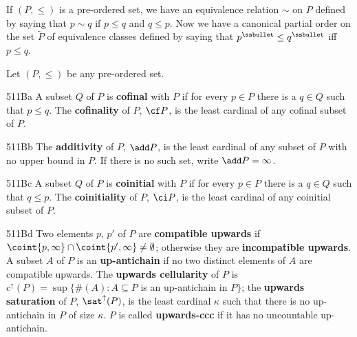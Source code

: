 If $(P,\le)$ is a pre-ordered set, we have an equivalence relation $\sim$
on $P$ defined by saying that $p\sim q$ if $p\le q$ and $q\le p$.   Now we
have a canonical partial order on the set $\tilde P$ of equivalence
classes defined by saying that $p^{\ssbullet}\le q^{\ssbullet}$ iff
$p\le q$.   

 Let $(P,\le)$ be any pre-ordered set.

\spheader 511Ba A subset $Q$ of $P$ is {\bf cofinal} with $P$ if for
every $p\in P$ there is a $q\in Q$ such that $p\le q$.   The
{\bf cofinality} of $P$, $\cf P$, is the least cardinal of any cofinal
subset of $P$.

\spheader 511Bb The {\bf additivity} of $P$, $\add P$, is the least
cardinal of any subset of $P$ with no upper bound in $P$.   If there is
no such set, write $\add P=\infty$.

\spheader 511Bc A subset $Q$ of $P$ is {\bf coinitial} with $P$ if for
every $p\in P$ there is a $q\in Q$ such that $q\le p$.   The
{\bf coinitiality} of $P$, $\ci P$, is the least cardinal of any
coinitial subset of $P$.

\spheader 511Bd Two elements $p$, $p'$ of $P$ are
{\bf compatible upwards} if
$\coint{p,\infty}\cap\coint{p',\infty}\ne\emptyset$;  otherwise they are
{\bf incompatible upwards}.   A subset $A$ of $P$ is an
{\bf up-antichain} if no two
distinct elements of $A$ are compatible upwards.   The {\bf
upwards cellularity} of $P$ is
$c^{\uparrow}(P)=\sup\{\#(A):A\subseteq P$ is an up-antichain in $P\}$;
the {\bf upwards saturation} of $P$, $\sat^{\uparrow}(P)$, is the least
cardinal $\kappa$ such that there is no up-antichain in $P$ of size
$\kappa$.   $P$ is called {\bf upwards-ccc} if it has no uncountable
up-antichain.


